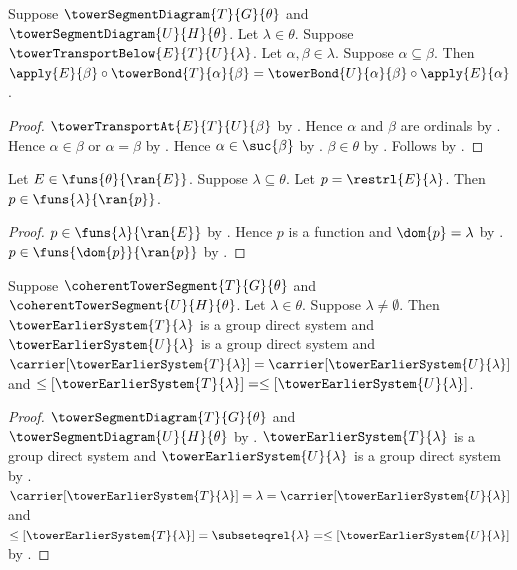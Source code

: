 \begin{proposition}\label{tower_transport_below_nonstrict_square}
    Suppose $\towerSegmentDiagram{T}{G}{\theta}$ and
        $\towerSegmentDiagram{U}{H}{\theta}$.
    Let $\lambda\in\theta$.
    Suppose $\towerTransportBelow{E}{T}{U}{\lambda}$.
    Let $\alpha,\beta\in\lambda$.
    Suppose $\alpha\subseteq\beta$.
    Then $\apply{E}{\beta}\circ\towerBond{T}{\alpha}{\beta}=
        \towerBond{U}{\alpha}{\beta}\circ\apply{E}{\alpha}$.
\end{proposition}
\begin{proof}
    $\towerTransportAt{E}{T}{U}{\beta}$ by
        .
    Hence $\alpha$ and $\beta$ are ordinals by
        .
    Hence $\alpha\in\beta$ or $\alpha=\beta$ by
        .
    Hence $\alpha\in\suc{\beta}$ by .
    $\beta\in\theta$ by .
    Follows by .
\end{proof}

\begin{proposition}\label{tower_transport_restriction_family_type}
    Let $E\in\funs{\theta}{\ran{E}}$.
    Suppose $\lambda\subseteq\theta$.
    Let $p=\restrl{E}{\lambda}$.
    Then $p\in\funs{\lambda}{\ran{p}}$.
\end{proposition}
\begin{proof}
    $p\in\funs{\lambda}{\ran{E}}$ by
        .
    Hence $p$ is a function and $\dom{p}=\lambda$ by
        .
    $p\in\funs{\dom{p}}{\ran{p}}$ by
        .
\end{proof}

\begin{proposition}\label{tower_transport_earlier_system_context}
    Suppose $\coherentTowerSegment{T}{G}{\theta}$ and
        $\coherentTowerSegment{U}{H}{\theta}$.
    Let $\lambda\in\theta$.
    Suppose $\lambda\neq\emptyset$.
    Then $\towerEarlierSystem{T}{\lambda}$ is a group direct system and
        $\towerEarlierSystem{U}{\lambda}$ is a group direct system and
        $\carrier[\towerEarlierSystem{T}{\lambda}]=
            \carrier[\towerEarlierSystem{U}{\lambda}]$ and
        $\leq[\towerEarlierSystem{T}{\lambda}]=
            \leq[\towerEarlierSystem{U}{\lambda}]$.
\end{proposition}
\begin{proof}
    $\towerSegmentDiagram{T}{G}{\theta}$ and
        $\towerSegmentDiagram{U}{H}{\theta}$ by
        .
    $\towerEarlierSystem{T}{\lambda}$ is a group direct system and
        $\towerEarlierSystem{U}{\lambda}$ is a group direct system by
        .
    $\carrier[\towerEarlierSystem{T}{\lambda}]=\lambda=
        \carrier[\towerEarlierSystem{U}{\lambda}]$ and
        $\leq[\towerEarlierSystem{T}{\lambda}]=\subseteqrel{\lambda}=
        \leq[\towerEarlierSystem{U}{\lambda}]$ by
        .
\end{proof}

